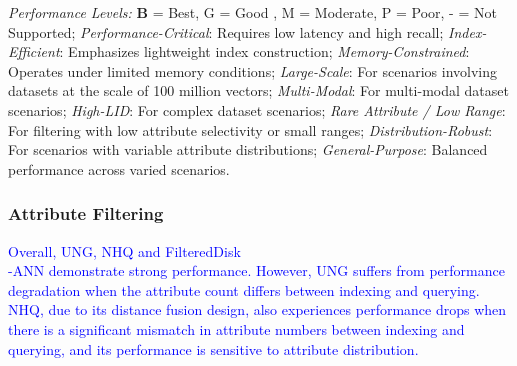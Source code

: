 \documentclass[sigconf, nonacm]{acmart}
\begin{document}
{\begin{table}[htbp]
\footnotesize{
	\begin{minipage}{\linewidth}
		\vspace{0.1cm}
		\textit{Performance Levels:} \textbf{B} = Best, G = Good , M = Moderate, P = Poor, - = Not Supported;
		\textit{Performance-Critical}: Requires low latency and high recall;
		\textit{Index-Efficient}: Emphasizes lightweight index construction;
		\textit{Memory-Constrained}: Operates under limited memory conditions;
		\textit{Large-Scale}: For scenarios involving datasets at the scale of 100 million vectors;
		\textit{Multi-Modal}: For multi-modal dataset scenarios;
		\textit{High-LID}: For complex dataset scenarios;
		\textit{Rare Attribute / Low Range}: For filtering with low attribute selectivity or small ranges;
		\textit{Distribution-Robust}: For scenarios with variable attribute distributions;
		\textit{General-Purpose}: Balanced performance across varied scenarios.
	
\end{minipage}}

\end{table}

	
	\subsubsection{Attribute Filtering}
\textcolor{blue}{
Overall, UNG, NHQ and FilteredDisk\\-ANN demonstrate strong performance. However, UNG suffers from performance degradation when the attribute count differs between indexing and querying. NHQ, due to its distance fusion design, also experiences performance drops when there is a significant mismatch in attribute numbers between indexing and querying, and its performance is sensitive to attribute distribution. }

}
\end{document}
